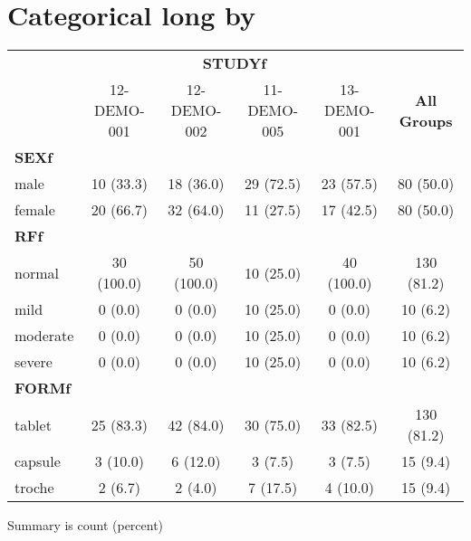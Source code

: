 \documentclass[
]{article}
\newenvironment{Shaded}{\begin{snugshade}}{\end{snugshade}}
\newcommand{\DataTypeTok}[1]{\textcolor[rgb]{0.13,0.29,0.53}{#1}}
\newcommand{\KeywordTok}[1]{\textcolor[rgb]{0.13,0.29,0.53}{\textbf{#1}}}
\newcommand{\NormalTok}[1]{#1}
\newcommand{\OperatorTok}[1]{\textcolor[rgb]{0.81,0.36,0.00}{\textbf{#1}}}
\newcommand{\StringTok}[1]{\textcolor[rgb]{0.31,0.60,0.02}{#1}}
\begin{document}
\clearpage

\hypertarget{categorical-long-by}{%
\section{Categorical long by}\label{categorical-long-by}}

\begin{Shaded}
\end{Shaded}

\begin{table}[h]
\centering
{\def\arraystretch{1.4}\tabcolsep=5pt
\begin{threeparttable}
\begin{tabular}[h]{lccccc}
\hline
\multicolumn{1}{c}{} & \multicolumn{4}{c}{\textbf{STUDYf}} & \multicolumn{1}{c}{}\\
\cmidrule(lr){2-5}
\ & 12-DEMO-001 & 12-DEMO-002 & 11-DEMO-005 & 13-DEMO-001 & \textbf{All Groups} \\
\hline
\multicolumn{6}{l}{\textbf{SEXf}}\\
male & 10 (33.3) & 18 (36.0) & 29 (72.5) & 23 (57.5) & 80 (50.0) \\
female & 20 (66.7) & 32 (64.0) & 11 (27.5) & 17 (42.5) & 80 (50.0) \\
\hline \multicolumn{6}{l}{\textbf{RFf}}\\
normal & 30 (100.0) & 50 (100.0) & 10 (25.0) & 40 (100.0) & 130 (81.2) \\
mild & 0 (0.0) & 0 (0.0) & 10 (25.0) & 0 (0.0) & 10 (6.2) \\
moderate & 0 (0.0) & 0 (0.0) & 10 (25.0) & 0 (0.0) & 10 (6.2) \\
severe & 0 (0.0) & 0 (0.0) & 10 (25.0) & 0 (0.0) & 10 (6.2) \\
\hline \multicolumn{6}{l}{\textbf{FORMf}}\\
tablet & 25 (83.3) & 42 (84.0) & 30 (75.0) & 33 (82.5) & 130 (81.2) \\
capsule & 3 (10.0) & 6 (12.0) & 3 (7.5) & 3 (7.5) & 15 (9.4) \\
troche & 2 (6.7) & 2 (4.0) & 7 (17.5) & 4 (10.0) & 15 (9.4) \\
\hline
\end{tabular}
\begin{tablenotes}[flushleft]
\item Summary is count (percent)
\end{tablenotes}
\end{threeparttable}
}
\end{table}
\end{document}
